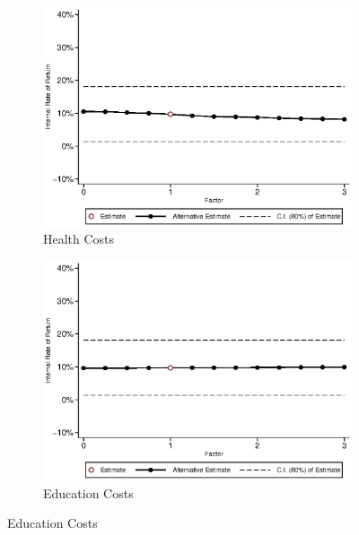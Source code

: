 \begin{figure}[H]
\ContinuedFloat	
	\begin{subfigure}[h]{0.8\textwidth}
	\centering
	\caption{Health Costs} \label{fig:irrf_health_f1}
	\includegraphics[width=\textwidth]{AppOutput/Sensitivity/irrf_health_f1.eps}
	\end{subfigure}
	
	\begin{subfigure}[h]{0.8\textwidth}
	\centering
	\caption{Education Costs} \label{fig:irrf_edu_f1}
	\includegraphics[width=\textwidth]{AppOutput/Sensitivity/irrf_edu_f1.eps}
	\end{subfigure}
\end{figure}

